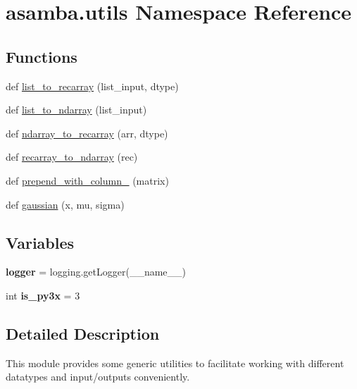 \hypertarget{namespaceasamba_1_1utils}{}\section{asamba.\+utils Namespace Reference}
\label{namespaceasamba_1_1utils}
\subsection*{Functions}
\begin{DoxyCompactItemize}
\item 
def \hyperlink{namespaceasamba_1_1utils_aa37a19f15b6c956eb813b052f8971f09}{list\+\_\+to\+\_\+recarray} (list\+\_\+input, dtype)
\item 
def \hyperlink{namespaceasamba_1_1utils_a28c2bc8cc997b1e6bb6fedc4ebc8cb2a}{list\+\_\+to\+\_\+ndarray} (list\+\_\+input)
\item 
def \hyperlink{namespaceasamba_1_1utils_af201868f9291b34bea14c4635687c190}{ndarray\+\_\+to\+\_\+recarray} (arr, dtype)
\item 
def \hyperlink{namespaceasamba_1_1utils_a1cb8e79c01ffa1dbbd8dec58aa531ae7}{recarray\+\_\+to\+\_\+ndarray} (rec)
\item 
def \hyperlink{namespaceasamba_1_1utils_a304af08913aaa7042678dc3f0b80a149}{prepend\+\_\+with\+\_\+column\+\_} (matrix)
\item 
def \hyperlink{namespaceasamba_1_1utils_af0a79ac380cda69e73c44389a8a059d8}{gaussian} (x, mu, sigma)
\end{DoxyCompactItemize}
\subsection*{Variables}
\begin{DoxyCompactItemize}
\item 
\mbox{\label{namespaceasamba_1_1utils_ab8a549bae1ee5f0cae09601644c00235}} 
{\bfseries logger} = logging.\+get\+Logger(\+\_\+\+\_\+name\+\_\+\+\_\+)
\item 
\mbox{\label{namespaceasamba_1_1utils_a2a4735f104cb2989c1ed9185b2076c83}} 
int {\bfseries is\+\_\+py3x} = 3
\end{DoxyCompactItemize}


\subsection{Detailed Description}
\begin{DoxyVerb}This module provides some generic utilities to facilitate working with different datatypes
and input/outputs conveniently.
\end{DoxyVerb}
 

